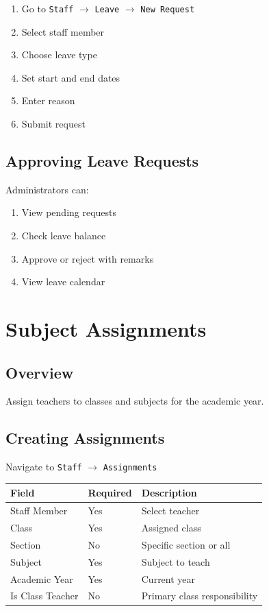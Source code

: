 \documentclass[12pt,a4paper]{report}
\begin{document}
\begin{enumerate}[leftmargin=*]
    \item Go to \texttt{Staff} $\rightarrow$ \texttt{Leave} $\rightarrow$ \texttt{New Request}
    \item Select staff member
    \item Choose leave type
    \item Set start and end dates
    \item Enter reason
    \item Submit request
\end{enumerate}

\section{Approving Leave Requests}

Administrators can:
\begin{enumerate}[leftmargin=*]
    \item View pending requests
    \item Check leave balance
    \item Approve or reject with remarks
    \item View leave calendar
\end{enumerate}

\chapter{Subject Assignments}

\section{Overview}

Assign teachers to classes and subjects for the academic year.

\section{Creating Assignments}

Navigate to \texttt{Staff} $\rightarrow$ \texttt{Assignments}

\begin{longtable}{@{}p{4cm}p{3cm}p{6cm}@{}}
\toprule
\textbf{Field} & \textbf{Required} & \textbf{Description} \\
\midrule
\endhead
Staff Member & Yes & Select teacher \\
Class & Yes & Assigned class \\
Section & No & Specific section or all \\
Subject & Yes & Subject to teach \\
Academic Year & Yes & Current year \\
Is Class Teacher & No & Primary class responsibility \\
\bottomrule
\end{longtable}
\end{document}
